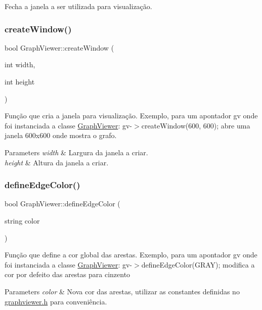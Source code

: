 Fecha a janela a ser utilizada para visualização. \mbox{\label{class_graph_viewer_ae5247dc66449dcd21fc5d531bbbaddfa}} 
\subsubsection{\texorpdfstring{createWindow()}{createWindow()}}
{\footnotesize\ttfamily bool Graph\+Viewer\+::create\+Window (\begin{DoxyParamCaption}\item[{int}]{width,  }\item[{int}]{height }\end{DoxyParamCaption})}

Função que cria a janela para visualização. Exemplo, para um apontador gv onde foi instanciada a classe \mbox{\hyperlink{class_graph_viewer}{Graph\+Viewer}}\+: gv-\/$>$create\+Window(600, 600); abre uma janela 600x600 onde mostra o grafo.


\begin{DoxyParams}{Parameters}
{\em width} & Largura da janela a criar. \\
\hline
{\em height} & Altura da janela a criar. \\
\hline
\end{DoxyParams}
\mbox{\label{class_graph_viewer_a4102580b69826ba83251ef7bb262f8be}} 
\subsubsection{\texorpdfstring{defineEdgeColor()}{defineEdgeColor()}}
{\footnotesize\ttfamily bool Graph\+Viewer\+::define\+Edge\+Color (\begin{DoxyParamCaption}\item[{string}]{color }\end{DoxyParamCaption})}

Função que define a cor global das arestas. Exemplo, para um apontador gv onde foi instanciada a classe \mbox{\hyperlink{class_graph_viewer}{Graph\+Viewer}}\+: gv-\/$>$define\+Edge\+Color(\+G\+R\+A\+Y); modifica a cor por defeito das arestas para cinzento


\begin{DoxyParams}{Parameters}
{\em color} & Nova cor das arestas, utilizar as constantes definidas no \mbox{\hyperlink{graphviewer_8h_source}{graphviewer.\+h}} para conveniência. \\
\hline
\end{DoxyParams}
\mbox{\label{class_graph_viewer_a08f362be0e682d91e7506dca8caae1b8}} 

